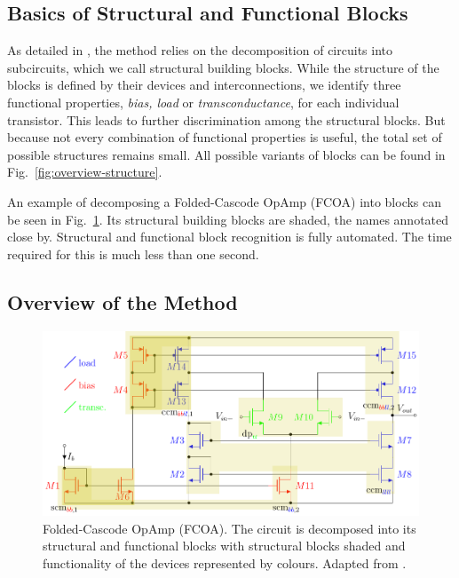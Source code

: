 \documentclass[conference]{IEEEtran}
\begin{document}
 	\subsection{Basics of Structural and Functional Blocks}
 	As detailed in \cite{ leibl24inverse}, the method  relies on the decomposition of circuits into subcircuits, which we call structural building blocks.
 	While the structure of the blocks is defined by their devices and interconnections, we identify three functional properties, \textit{bias, load} or \textit{transconductance}, for each individual transistor. This leads to further discrimination among the structural blocks. But because not every combination of functional properties is useful, the total set of possible structures remains small. 
	All possible variants of blocks can be found in Fig.~\ref{fig:overview-structure}.
	
	An example of decomposing a Folded-Cascode OpAmp (FCOA) into blocks can be seen in Fig.~\ref{fig:simple53}. Its structural building blocks are shaded, the names annotated close by.
	Structural and functional block recognition is fully automated. The time required for this is much less than one second. 
	
\subsection{Overview of the Method}
	\begin{figure}[]
		\centering
		\includegraphics[width=\linewidth]{figures/simple52_partitioning}
		\caption{Folded-Cascode OpAmp (FCOA). The circuit is decomposed into its structural and functional blocks with structural blocks shaded and functionality of the devices represented by colours. Adapted from \cite{leibl24inverse}.}
		\label{fig:simple53}
	\end{figure}
	
\end{document}
